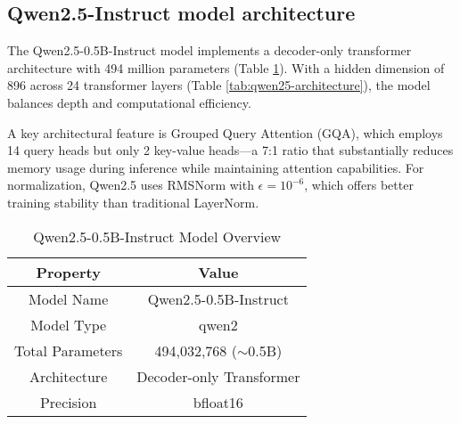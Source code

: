 \documentclass{article}
\begin{document}
\subsection*{Qwen2.5-Instruct model architecture}
The Qwen2.5-0.5B-Instruct model implements a decoder-only transformer architecture with 494 million parameters (Table \ref{tab:qwen25-overview}). With a hidden dimension of 896 across 24 transformer layers (Table \ref{tab:qwen25-architecture}), the model balances depth and computational efficiency.

A key architectural feature is Grouped Query Attention (GQA), which employs 14 query heads but only 2 key-value heads—a 7:1 ratio that substantially reduces memory usage during inference while maintaining attention capabilities. For normalization, Qwen2.5 uses RMSNorm with $\epsilon = 10^{-6}$, which offers better training stability than traditional LayerNorm.
\begin{table}[H]
\centering
\begin{tabular}{c c}
\hline
\textbf{Property} & \textbf{Value} \\
\hline
Model Name & Qwen2.5-0.5B-Instruct \\
Model Type & qwen2 \\
Total Parameters & 494,032,768 ($\sim$0.5B) \\
Architecture & Decoder-only Transformer \\
Precision & bfloat16 \\
\hline
\end{tabular}
\caption{Qwen2.5-0.5B-Instruct Model Overview}
\label{tab:qwen25-overview}
\end{table}



\end{document}
